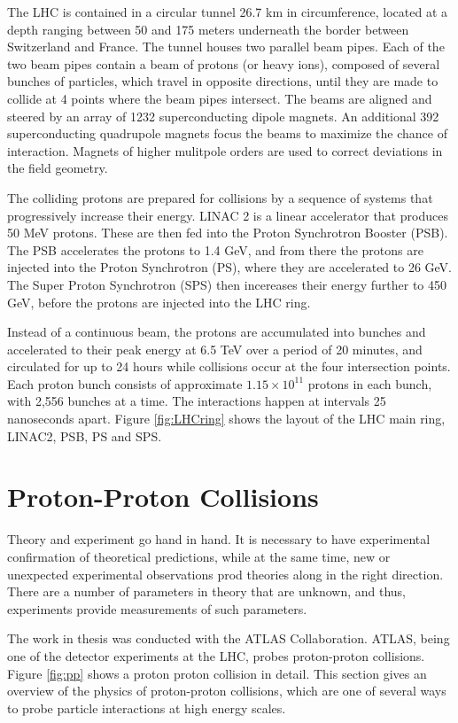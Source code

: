 \documentclass[12pt,a4paper,openright,twoside]{report}
\begin{document}
The LHC is contained in a circular tunnel 26.7 km in circumference, located at a depth ranging between 50 and 175 meters underneath the border between Switzerland and France. The tunnel houses two parallel beam pipes. Each of the two beam pipes contain a beam of protons (or heavy ions), composed of several bunches of particles, which travel in opposite directions, until they are made to collide at 4 points where the beam pipes intersect. The beams are aligned and steered by an array of 1232 superconducting dipole magnets. An additional 392 superconducting quadrupole magnets focus the beams to maximize the chance of interaction. Magnets of higher mulitpole orders are used to correct deviations in the field geometry.

The colliding protons are prepared for collisions by a sequence of systems that progressively increase their energy. LINAC 2 is a linear accelerator that produces 50 MeV protons. These are then fed into the Proton Synchrotron Booster (PSB). The PSB accelerates the protons to 1.4 GeV, and from there the protons are injected into the Proton Synchrotron (PS), where they are accelerated to 26 GeV. The Super Proton Synchrotron (SPS) then incereases their energy further to 450 GeV, before the protons are injected into the LHC ring. 

Instead of a continuous beam, the protons are accumulated into bunches and accelerated to their peak energy at 6.5 TeV over a period of 20 minutes, and circulated for up to 24 hours while collisions occur at the four intersection points. Each proton bunch consists of approximate $1.15\times 10^{11}$ protons in each bunch, with 2,556 bunches \cite{bunch} at a time. The interactions happen at intervals 25 nanoseconds apart. Figure \ref{fig:LHCring} shows the layout of the LHC main ring, LINAC2, PSB, PS and SPS.

\section{Proton-Proton Collisions}
Theory and experiment go hand in hand. It is necessary to have experimental confirmation of theoretical predictions, while at the same time, new or unexpected experimental observations prod theories along in the right direction. There are a number of parameters in theory that are unknown, and thus, experiments provide measurements of such parameters. 

The work in thesis was conducted with the ATLAS Collaboration. ATLAS, being one of the detector experiments at the LHC, probes proton-proton collisions. Figure \ref{fig:pp} shows a proton proton collision in detail. This section gives an overview of the physics of proton-proton collisions, which are one of several ways to probe particle interactions at high energy scales.
\end{document}
